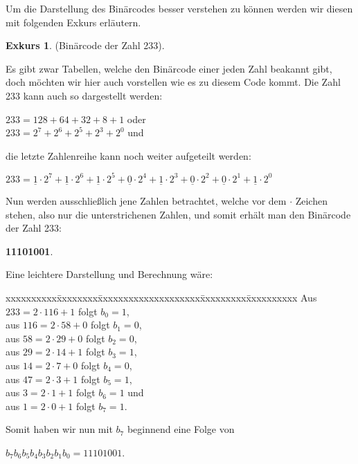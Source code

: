 \documentclass[12pt,a4paper]{article}
\theoremstyle{definition}
\newtheorem{exkurs}{Exkurs}
\begin{document}
Um die Darstellung des Binärcodes besser verstehen zu können werden wir diesen mit folgenden Exkurs erläutern.
\begin{exkurs}(Binärcode der Zahl 233).\label{Binärcode der Zahl 233}
\par\begingroup\leftskip=0.5cm\rightskip=0.5cm\noindent
Es gibt zwar Tabellen, welche den Binärcode einer jeden Zahl beakannt gibt, doch möchten wir hier auch vorstellen wie es zu diesem Code kommt.
Die Zahl 233 kann auch so dargestellt werden:
\begin{center}
$233 = 128 + 64 + 32 + 8 + 1$ oder \\
$233 = 2^7 + 2^6 + 2^5 + 2^3 + 2^0$ und \\
\end{center}
die letzte Zahlenreihe kann noch weiter aufgeteilt werden:
\begin{center}
$233 = \underline{1} \cdot 2^7 + \underline{1} \cdot 2^6 + \underline{1} \cdot 2^5 + \underline{0} \cdot2^4 + \underline{1} \cdot 2^3 + \underline{0} \cdot2^2 + \underline{0} \cdot 2^1 + \underline{1} \cdot 2^0$
\end{center}
Nun werden ausschließlich jene Zahlen betrachtet, welche vor dem $\cdot$ Zeichen stehen, also nur die unterstrichenen Zahlen, und somit erhält man den Binärcode der Zahl 233:
\begin{center}
\textbf{11101001}.
\end{center}

Eine leichtere Darstellung und Berechnung wäre:
\begin{tabbing}
xxxxxxxxxx\=xxxxxxxx\=xxxxxxxxxxxxxxxxxxxx\=xxxxxxxxx\=xxxxxxxxxx\kill
\> Aus \> $233 = 2 \cdot 116 + 1$ \> folgt \> $b_0 = 1$, \\
\> aus \> $116 = 2 \cdot 58 + 0$  \> folgt \> $b_1 = 0$, \\
\> aus \> $58  = 2 \cdot 29 + 0$  \> folgt \> $b_2 = 0$, \\
\> aus \> $29  = 2 \cdot 14 + 1$  \> folgt \> $b_3 = 1$, \\
\> aus \> $14  = 2 \cdot 7 + 0$   \> folgt \> $b_4 = 0$, \\
\> aus \> $47  = 2 \cdot 3 + 1$   \> folgt \> $b_5 = 1$, \\
\> aus \> $3   = 2 \cdot 1 + 1$   \> folgt \> $b_6 = 1$  und \\
\> aus \> $1   = 2 \cdot 0 + 1$   \> folgt \> $b_7 = 1$.
\end{tabbing}
Somit haben wir nun mit $b_7$ beginnend eine Folge von
\begin{center}
$b_7b_6b_5b_4b_3b_2b_1b_0 = 11101001$.
\end{center}


\end{exkurs}
\end{document}
